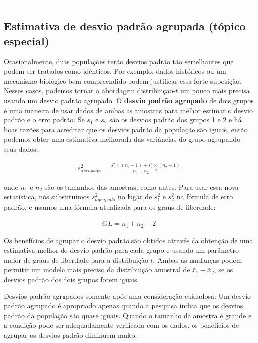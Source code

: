 \documentclass[
]{book}
\theoremstyle{definition}
\theoremstyle{definition}
\theoremstyle{definition}
\theoremstyle{definition}
\theoremstyle{remark}
\begin{document}
\begin{center}\rule{0.5\linewidth}{0.5pt}\end{center}

\hypertarget{estimateSDGrouped}{%
\subsection{Estimativa de desvio padrão agrupada (tópico especial)}\label{estimateSDGrouped}}

Ocasionalmente, duas populações terão desvios padrão tão semelhantes que podem ser tratados como idênticos. Por exemplo, dados históricos ou um mecanismo biológico bem compreendido podem justificar essa forte suposição. Nesses casos, podemos tornar a abordagem distribuição-\(t\) um pouco mais precisa usando um desvio padrão agrupado.
O \textbf{desvio padrão agrupado} de dois grupos é uma maneira de usar dados de ambas as amostras para melhor estimar o desvio padrão e o erro padrão. Se \(s_1^{}\) e \(s_2^{}\) são os desvios padrão dos grupos 1 e 2 e há boas razões para acreditar que os desvios padrão da população são iguais, então podemos obter uma estimativa melhorada das variâncias do grupo agrupando seus dados:

\begin{align*}
s_{agrupado}^2 = \frac{s_1^2\times (n_1-1) + s_2^2\times (n_2-1)}{n_1 + n_2 - 2}
\end{align*}

onde \(n_1\) e \(n_2\) são os tamanhos das amostras, como antes. Para usar essa nova estatística, nós substituímos \(s_{agrupado}^2\) no lugar de \(s_1^2\) e \(s_2^2\) na fórmula de erro padrão, e usamos uma fórmula atualizada para os graus de liberdade:

\begin{align*}
GL = n_1 + n_2 - 2
\end{align*}

Os benefícios de agrupar o desvio padrão são obtidos através da obtenção de uma estimativa melhor do desvio padrão para cada grupo e usando um parâmetro maior de graus de liberdade para a distribuição-\(t\). Ambas as mudanças podem permitir um modelo mais preciso da distribuição amostral de \(\bar{x}_1 - \bar{x}_2\), se os desvios padrão dos dois grupos forem iguais.

Desvios padrão agrupados somente após uma consideração cuidadosa: Um desvio padrão agrupado é apropriado apenas quando a pesquisa indica que os desvios padrão da população são quase iguais. Quando o tamanho da amostra é grande e a condição pode ser adequadamente verificada com os dados, os benefícios de agrupar os desvios padrão diminuem muito.
\end{document}

